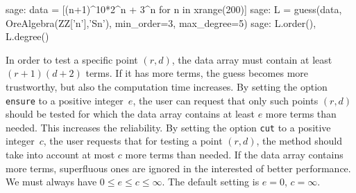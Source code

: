 \documentclass[11pt]{amsart}
\begin{document}
\begin{sageexample}
sage: data = [(n+1)^10*2^n + 3^n for n in xrange(200)]
sage: L = guess(data, OreAlgebra(ZZ['n'],'Sn'), min_order=3, max_degree=5)
sage: L.order(), L.degree()
\end{sageexample}

In order to test a specific point $(r,d)$, the data array must contain at least $(r+1)(d+2)$ terms. 
If it has more terms, the guess becomes more trustworthy, but also the computation time increases.
By setting the option \verb|ensure| to a positive integer~$e$, the user can request that only 
such points $(r,d)$ should be tested for which the data array contains at least $e$ more terms than
needed. This increases the reliability. By setting the option \verb|cut| to a positive integer~$c$,
the user requests that for testing a point $(r,d)$, the method should take into account at most $c$
more terms than needed. If the data array contains more terms, superfluous ones are ignored in the
interested of better performance. We must always have $0\leq e\leq c\leq \infty$. The default setting
is $e=0$, $c=\infty$. 

 
 
 
\end{document}
